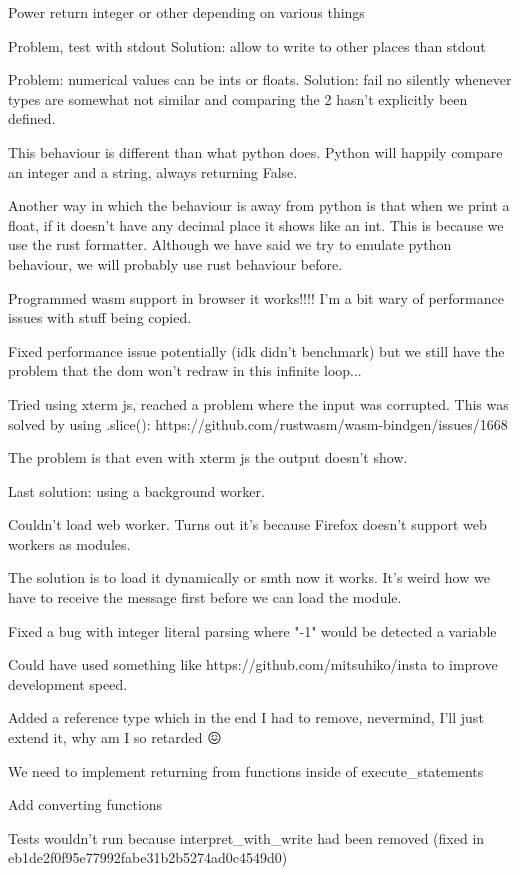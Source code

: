 \documentclass{article}
\begin{document}
Power return integer or other depending on various things

Problem, test with stdout
Solution: allow to write to other places than stdout

Problem: numerical values can be ints or floats.
Solution: fail no silently whenever types are somewhat not similar and
comparing the 2 hasn't explicitly been defined.

This behaviour is different than what python does. Python will happily compare
an integer and a string, always returning False.

Another way in which the behaviour is away from python is that when we print a
float, if it doesn't have any decimal place it shows like an int. This is
because we use the rust formatter. Although we have said we try to emulate
python behaviour, we will probably use rust behaviour before.

Programmed wasm support in browser it works!!!! I'm a bit wary of performance
issues with stuff being copied.

Fixed performance issue potentially (idk didn't benchmark) but we still have
the problem that the dom won't redraw in this infinite loop...

Tried using xterm js, reached a problem where the input was corrupted. This was
solved by using .slice(): https://github.com/rustwasm/wasm-bindgen/issues/1668

The problem is that even with xterm js the output doesn't show.

Last solution: using a background worker.

Couldn't load web worker. Turns out it's because Firefox doesn't support web
workers as modules.

The solution is to load it dynamically or smth now it works. It's weird how we
have to receive the message first before we can load the module.

Fixed a bug with integer literal parsing where "-1" would be detected a
variable

Could have used something like https://github.com/mitsuhiko/insta to improve
development speed.

Added a reference type which in the end I had to remove, nevermind, I'll just
extend it, why am I so retarded 😖

We need to implement returning from functions inside of execute\_statements

Add converting functions

Tests wouldn't run because interpret\_with\_write had been removed (fixed in
eb1de2f0f95e77992fabe31b2b5274ad0c4549d0)
\end{document}
